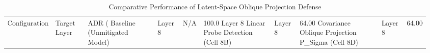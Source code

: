 \begin{table}
\caption{Comparative Performance of Latent-Space Oblique Projection Defense}
\label{tab:defense_results}
\begin{tabular}{llllll}
\toprule
Configuration & Target Layer & ADR (%
\midrule
Baseline (Unmitigated Model) & Layer 8 & N/A & 100.0%
Layer 8 Linear Probe Detection (Cell 8B) & Layer 8 & 64.00%
Covariance Oblique Projection P_Sigma (Cell 8D) & Layer 8 & 64.00%
\bottomrule
\end{tabular}
\end{table}
